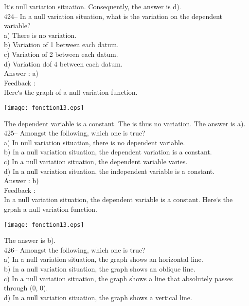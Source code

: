 ﻿\documentclass[letterpaper, 12pt]{article}
\begin{document}
It`s null variation situation.  Consequently, the answer is d).\\

424-- In a null variation situation, what is the variation on the dependent variable?\\
a) There is no variation.\\
b) Variation of 1 between each datum.\\
c) Variation of 2 between each datum.\\
d) Variation dof 4 between each datum.\\

Answer :  a)\\

Feedback : \\
Here`s the graph of a null variation function.\\
    \begin{center}
    \texttt{[image: fonction13.eps]}
    \end{center}
The dependent variable is a constant. The is thus no variation.
  The answer is a).\\

425-- Amongst the following, which one is true?\\
a) In null variation situation, there is no dependent variable.\\
b) In a null variation situation, the dependent variation is a constant.\\
c) In a null variation situation, the dependent variable varies.\\
d) In a null variation situation, the independent variable is a constant.\\


Answer :  b)\\

Feedback : \\
In a null variation situation, the dependent variable is a constant. Here`s the grpah a null variation function.\\
    \begin{center}
    \texttt{[image: fonction13.eps]}
    \end{center}

The answer is b).\\

426-- Amongst the following, which one is true?\\
a) In a null variation situation, the graph shows an horizontal line.\\
b) In a null variation situation, the graph shows an oblique line.\\
c) In a null variation situation, the graph shows a line that absolutely passes through (0, 0).\\
d) In a null variation situation, the graph shows a vertical line.\\
\end{document}
